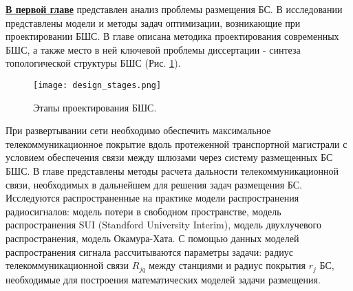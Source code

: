 \underline{\textbf{В первой главе}} представлен анализ проблемы размещения БС. В исследовании представлены модели и методы задач оптимизации, возникающие при проектировании БШС. В главе описана методика проектирования современных БШС, а также место в ней ключевой проблемы диссертации - синтеза топологической структуры БШС (Рис. \cref{fig:part1_design_stages}).


 


\begin{figure}[h!]
    \centering
     \texttt{[image: design\_stages.png]}
  \caption{Этапы проектирования БШС.}
  \label{fig:part1_design_stages}
  \end{figure}



При развертывании сети необходимо обеспечить максимальное телекоммуникационное покрытие вдоль протеженной транспортной магистрали с условием обеспечения связи между шлюзами через систему размещенных БС БШС. В главе представлены методы расчета дальности телекоммуникационной связи, необходимых в дальнейшем для решения задач размещения БС. Исследуются распространенные на практике модели распространения радиосигналов: модель потери в свободном пространстве,  модель распространения SUI (Standford University Interim), модель двухлучевого распространения, модель Окамура-Хата. С помощью данных моделей распространения сигнала рассчитываются параметры задачи: радиус телекоммуникационной связи $ R_{jq}$ между станциями и радиус покрытия $ r_j $ БС, необходимые для построения математических моделей задачи размещения.





